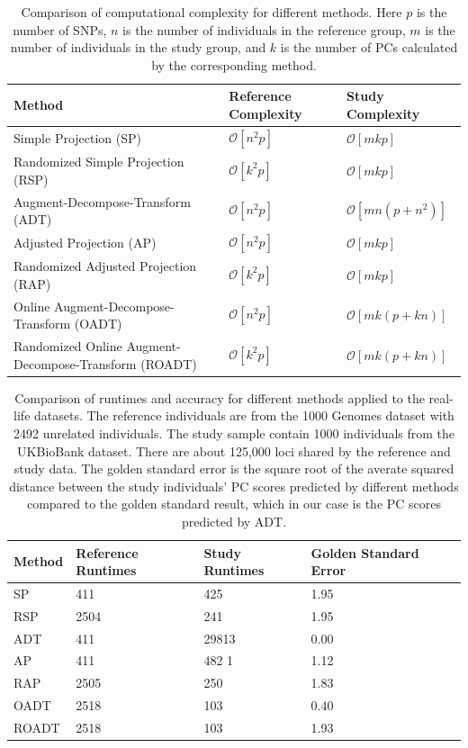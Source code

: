 \documentclass{article}
\newcommand{\bO}{\mathcal{O}}
\begin{document}
\begin{table} 
  \centering
  \begin{tabular}{|l|l|l|}
    \hline
    Method & Reference Complexity & Study Complexity \\ 
    \hline
    Simple Projection (SP) & $\bO[n^2p]$ & $\bO[mkp]$ \\
    \hline
    Randomized Simple Projection (RSP) & $\bO[k^2p]$ & $\bO[mkp]$ \\
    \hline
    Augment-Decompose-Transform (ADT) & $\bO[n^2 p]$ & $\bO[mn(p + n^2)]$ \\
    \hline
    Adjusted Projection (AP) & $\bO[n^2p]$ &  $\bO[mkp]$ \\
    \hline
    Randomized Adjusted Projection (RAP) & $\bO[k^2p]$ &  $\bO[mkp]$ \\
    \hline
    Online Augment-Decompose-Transform (OADT) & $\bO[n^2 p]$ & $\bO[mk(p + k n)]$ \\
    \hline
    Randomized Online Augment-Decompose-Transform (ROADT) & $\bO[k^2 p]$ & $\bO[mk(p + k n)]$ \\
    \hline
  \end{tabular}
  \caption{
    Comparison of computational complexity for different methods.
    Here $p$ is the number of SNPs,
    $n$ is the number of individuals in the reference group,
    $m$ is the number of individuals in the  study group,
    and $k$ is the number of PCs calculated by the corresponding method.
  }
  \label{tbl:cplx}
\end{table}

\begin{table} 
  \centering
  \begin{tabular}{|l|l|l|l|l|}
    \hline
    Method & Reference Runtimes & Study Runtimes & Golden Standard Error \\ 
    \hline
    SP & 411 & 425 & 1.95 \\
    \hline
    RSP & 2504 & 241 & 1.95 \\
    \hline
    ADT & 411 & 29813 & 0.00 \\
    \hline
    AP & 411 & 482 1 & 1.12 \\
    \hline
    RAP & 2505 & 250 & 1.83 \\ 
    \hline
    OADT & 2518 & 103 & 0.40 \\
    \hline
    ROADT & 2518 & 103 & 1.93 \\
    \hline
  \end{tabular}
  \caption{
    Comparison of runtimes and accuracy for different methods applied to the real-life datasets.
    The reference individuals are from the 1000 Genomes dataset with 2492 unrelated individuals.
    The study sample contain 1000 individuals from the UKBioBank dataset.
    There are about 125,000 loci shared by the reference and study data.
    The golden standard error is the square root of the averate squared distance between the study individuals' PC scores predicted by different methods compared to the golden standard result, which in our case is the PC scores predicted by ADT.
  }
  \label{tbl:cplx}
\end{table}
\end{document}
